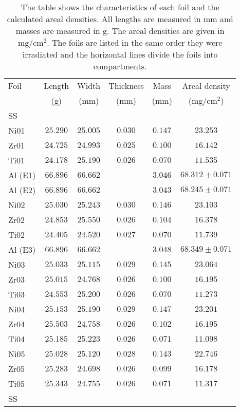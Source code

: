 \begin{table}[htbp]
    \centering
    \label{Tab:foilcharacterization}
       \caption[Foil characterization]{The table shows the characteristics of each foil and the calculated areal densities. All lengths are measured in mm and masses are measured in g. The areal densities are given in mg/cm$^2$. The foils are listed in the same order they were irradiated and the horizontal lines divide the foils into compartments.}
    \begin{tabular}{lccccc}
        \toprule
        \textsf{Foil} & \textsf{Length} & \textsf{Width} & \textsf{Thickness} & \textsf{Mass} &  \textsf{Areal density}      \\
         & \textsf{(g)} & \textsf{(mm)} & \textsf{(mm)} & \textsf{(mm)}  & \textsf{(mg/cm$^2$)}      \\
        \midrule
        SS  & & & & &  \\
        \midrule
        Ni01  & $25.290$ & $25.005$ & $0.030$ & $0.147$ & $23.253$  \\
        Zr01  & $24.725$ & $24.993$ & $0.025$ & $0.100$ & $16.142$  \\
        Ti01  & $24.178$ & $25.190$ & $0.026$ & $0.070$ & $11.535$  \\
        Al (E1)  & $66.896$ & $66.662$ & & $3.046$ &  $68.312\pm0.071$\\
        Al (E2)  & $66.896$ & $66.662$ & & $3.043$  & $68.245\pm0.071$  \\
        \midrule
        Ni02  & $25.030$ & $25.243$ & $0.030$ & $0.146$ & $23.103$  \\
        Zr02  & $24.853$ & $25.550$ & $0.026$ & $0.104$ & $16.378$  \\
        Ti02  & $24.405$ & $24.520$ & $0.027$ & $0.070$ & $11.739$  \\
        Al (E3)  & $66.896$ & $66.662$ & & $3.048$ & $68.349\pm0.071$  \\
        \midrule
        Ni03  & $25.033$ & $25.115$ & $0.029$ & $0.145$ & $23.064$ \\
        Zr03  & $25.015$ & $24.768$ & $0.026$ & $0.100$ & $16.195$  \\
        Ti03  & $24.553$ & $25.200$ & $0.026$ & $0.070$ & $11.273$  \\
        \midrule
        Ni04  & $25.153$ & $25.190$ & $0.029$ & $0.147$ & $23.201$  \\
        Zr04  & $25.503$ & $24.758$ & $0.026$ & $0.102$ & $16.195$  \\
        Ti04  & $25.185$ & $25.223$ & $0.026$ & $0.071$ & $11.098$  \\
        \midrule
        Ni05  & $25.028$ & $25.120$ & $0.028$ & $0.143$ & $22.746$  \\
        Zr05  & $25.283$ & $24.698$ & $0.026$ & $0.099$ & $16.178$  \\
        Ti05  & $25.343$ & $24.755$ & $0.026$ & $0.071$ & $11.317$  \\
        \midrule
        SS & & & & & \\
        \bottomrule
    \end{tabular}
\end{table}

